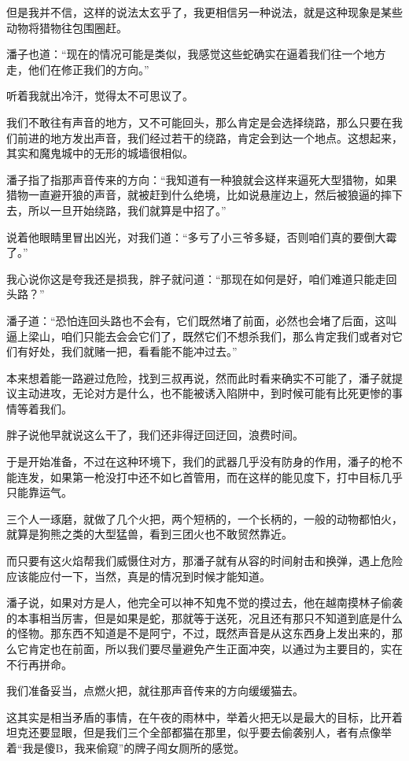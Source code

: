 但是我并不信，这样的说法太玄乎了，我更相信另一种说法，就是这种现象是某些动物将猎物往包围圈赶。

潘子也道：“现在的情况可能是类似，我感觉这些蛇确实在逼着我们往一个地方走，他们在修正我们的方向。”

听着我就出冷汗，觉得太不可思议了。

我们不敢往有声音的地方，又不可能回头，那么肯定是会选择绕路，那么只要在我们前进的地方发出声音，我们经过若干的绕路，肯定会到达一个地点。这想起来，其实和魔鬼城中的无形的城墙很相似。

潘子指了指那声音传来的方向：“我知道有一种狼就会这样来逼死大型猎物，如果猎物一直避开狼的声音，就被赶到什么绝境，比如说悬崖边上，然后被狼逼的摔下去，所以一旦开始绕路，我们就算是中招了。”

说着他眼睛里冒出凶光，对我们道：“多亏了小三爷多疑，否则咱们真的要倒大霉了。”

我心说你这是夸我还是损我，胖子就问道：“那现在如何是好，咱们难道只能走回头路？”

潘子道：“恐怕连回头路也不会有，它们既然堵了前面，必然也会堵了后面，这叫逼上梁山，咱们只能去会会它们了，既然它们不想杀我们，那么肯定我们或者对它们有好处，我们就赌一把，看看能不能冲过去。”

本来想着能一路避过危险，找到三叔再说，然而此时看来确实不可能了，潘子就提议主动进攻，无论对方是什么，也不能被诱入陷阱中，到时候可能有比死更惨的事情等着我们。

胖子说他早就说这么干了，我们还非得迂回迂回，浪费时间。

于是开始准备，不过在这种环境下，我们的武器几乎没有防身的作用，潘子的枪不能连发，如果第一枪没打中还不如匕首管用，而在这样的能见度下，打中目标几乎只能靠运气。

三个人一琢磨，就做了几个火把，两个短柄的，一个长柄的，一般的动物都怕火，就算是狗熊之类的大型猛兽，看到三团火也不敢贸然靠近。

而只要有这火焰帮我们威慑住对方，那潘子就有从容的时间射击和换弹，遇上危险应该能应付一下，当然，真是的情况到时候才能知道。

潘子说，如果对方是人，他完全可以神不知鬼不觉的摸过去，他在越南摸林子偷袭的本事相当厉害，但是如果是蛇，那就等于送死，况且还有那只不知道到底是什么的怪物。那东西不知道是不是阿宁，不过，既然声音是从这东西身上发出来的，那么它肯定也在前面，所以我们要尽量避免产生正面冲突，以通过为主要目的，实在不行再拼命。

我们准备妥当，点燃火把，就往那声音传来的方向缓缓猫去。

这其实是相当矛盾的事情，在午夜的雨林中，举着火把无以是最大的目标，比开着坦克还要显眼，但是我们三个全部都猫在那里，似乎要去偷袭别人，者有点像举着“我是傻B，我来偷窥”的牌子闯女厕所的感觉。

